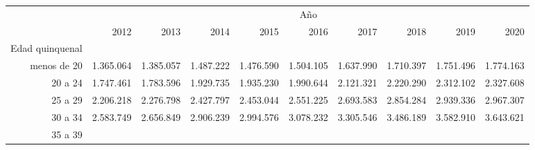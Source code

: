 \begin{tabular}{llllllllll}
\cline{1-10}
\multicolumn{1}{c}{} &
  \multicolumn{9}{|c}{Año} \\
\multicolumn{1}{c}{} &
  \multicolumn{1}{|r}{2012} &
  \multicolumn{1}{r}{2013} &
  \multicolumn{1}{r}{2014} &
  \multicolumn{1}{r}{2015} &
  \multicolumn{1}{r}{2016} &
  \multicolumn{1}{r}{2017} &
  \multicolumn{1}{r}{2018} &
  \multicolumn{1}{r}{2019} &
  \multicolumn{1}{r}{2020} \\
\cline{1-10}
\multicolumn{1}{r}{Edad quinquenal} &
  \multicolumn{1}{|r}{} &
  \multicolumn{1}{r}{} &
  \multicolumn{1}{r}{} &
  \multicolumn{1}{r}{} &
  \multicolumn{1}{r}{} &
  \multicolumn{1}{r}{} &
  \multicolumn{1}{r}{} &
  \multicolumn{1}{r}{} &
  \multicolumn{1}{r}{} \\
\multicolumn{1}{r}{menos de 20\hspace{1em}} &
  \multicolumn{1}{|r}{1.365.064} &
  \multicolumn{1}{r}{1.385.057} &
  \multicolumn{1}{r}{1.487.222} &
  \multicolumn{1}{r}{1.476.590} &
  \multicolumn{1}{r}{1.504.105} &
  \multicolumn{1}{r}{1.637.990} &
  \multicolumn{1}{r}{1.710.397} &
  \multicolumn{1}{r}{1.751.496} &
  \multicolumn{1}{r}{1.774.163} \\
\multicolumn{1}{r}{20 a 24\hspace{1em}} &
  \multicolumn{1}{|r}{1.747.461} &
  \multicolumn{1}{r}{1.783.596} &
  \multicolumn{1}{r}{1.929.735} &
  \multicolumn{1}{r}{1.935.230} &
  \multicolumn{1}{r}{1.990.644} &
  \multicolumn{1}{r}{2.121.321} &
  \multicolumn{1}{r}{2.220.290} &
  \multicolumn{1}{r}{2.312.102} &
  \multicolumn{1}{r}{2.327.608} \\
\multicolumn{1}{r}{25 a 29\hspace{1em}} &
  \multicolumn{1}{|r}{2.206.218} &
  \multicolumn{1}{r}{2.276.798} &
  \multicolumn{1}{r}{2.427.797} &
  \multicolumn{1}{r}{2.453.044} &
  \multicolumn{1}{r}{2.551.225} &
  \multicolumn{1}{r}{2.693.583} &
  \multicolumn{1}{r}{2.854.284} &
  \multicolumn{1}{r}{2.939.336} &
  \multicolumn{1}{r}{2.967.307} \\
\multicolumn{1}{r}{30 a 34\hspace{1em}} &
  \multicolumn{1}{|r}{2.583.749} &
  \multicolumn{1}{r}{2.656.849} &
  \multicolumn{1}{r}{2.906.239} &
  \multicolumn{1}{r}{2.994.576} &
  \multicolumn{1}{r}{3.078.232} &
  \multicolumn{1}{r}{3.305.546} &
  \multicolumn{1}{r}{3.486.189} &
  \multicolumn{1}{r}{3.582.910} &
  \multicolumn{1}{r}{3.643.621} \\
\multicolumn{1}{r}{35 a 39\hspace{1em}} &

\end{tabular}
